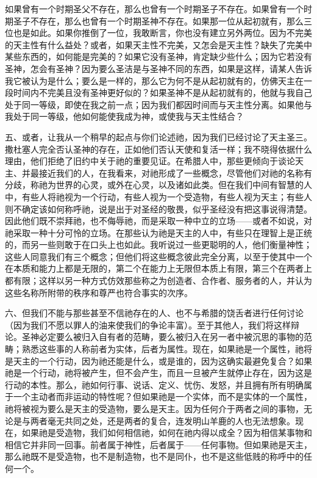 如果曾有一个时期圣父不存在，那么也曾有一个时期圣子不存在。如果曾有一个时期圣子不存在，那么也曾有一个时期圣神不存在。如果那一位从起初就有，那么三位也是如此。如果你推倒了一位，我敢断言，你也没有建立另外两位。因为不完美的天主性有什么益处？或者，如果天主性不完美，又怎会是天主性？缺失了完美中某些东西的，如何能是完美的？如果它没有圣神，肯定缺少些什么；因为它若没有圣神，怎会有圣神？因为要么圣洁是与圣神不同的东西，如果是这样，请某人告诉我它被认为是什么；要么是一样的，那么它为何不是从起初就有的，仿佛天主在一段时间内不完美且没有圣神更好似的？如果圣神不是从起初就有的，他就与我自己处于同一等级，即使在我之前一点；因为我们都因时间而与天主性分离。如果他与我处于同一等级，他如何能使我成为神，或使我与天主性结合？\par

五、或者，让我从一个稍早的起点与你们论述祂，因为我们已经讨论了天主圣三。撒杜塞人完全否认圣神的存在，正如他们否认天使和复活一样；我不晓得依据什么理由，他们拒绝了旧约中关于祂的重要见证。在希腊人中，那些更倾向于谈论天主、并最接近我们的人，在我看来，对祂形成了一些概念，尽管他们对祂的名称有分歧，称祂为世界的心灵，或外在心灵，以及诸如此类。但在我们中间有智慧的人中，有些人将祂视为一个行动，有些人视为一个受造物，有些人视为天主；有些人则不确定该如何称呼祂，说是出于对圣经的敬畏，似乎圣经没有把这事说得清楚。因此他们既不崇拜祂，也不侮辱祂，而是采取一种中立的立场——或者不如说，对祂采取一种十分可怜的立场。在那些认为祂是天主的人中，有些只在理智上是正统的，而另一些则敢于在口头上也如此。我听说过一些更聪明的人，他们衡量神性；这些人同意我们有三个概念；但他们将这些概念彼此完全分离，以至于使其中一个在本质和能力上都是无限的，第二个在能力上无限但本质上有限，第三个在两者上都有限；这样以另一种方式仿效那些称之为创造者、合作者、服务者的人，并认为这些名称所附带的秩序和尊严也符合事实的次序。\par

六、但我们不能与那些甚至不信祂存在的人、也不与希腊的饶舌者进行任何讨论（因为我们不愿以罪人的油来使我们的争论丰富）。至于其他人，我们将这样辩论。圣神必定要么被归入自有者的范畴，要么被归入在另一者中被沉思的事物的范畴；熟悉这些事的人称前者为实体，后者为属性。现在，如果祂是一个属性，祂将是天主的一个行动，因为祂还能是什么，或是谁的，因为这确实最避免复合？如果祂是一个行动，祂将被产生，但不会产生，而且一旦被产生就停止存在，因为这是行动的本性。那么，祂如何行事、说话、定义、忧伤、发怒，并且拥有所有明确属于一个主动者而非运动的特性呢？但如果祂是一个实体，而不是实体的一个属性，祂将被视为要么是天主的受造物，要么是天主。因为任何介于两者之间的事物，无论是与两者毫无共同之处，还是两者的复合，连发明山羊鹿的人也无法想象。现在，如果祂是受造物，我们如何相信祂，如何在祂内得以成全？因为相信某事物和相信它并非同一回事。前者属于神性，后者属于——任何事物。但如果祂是天主，那么祂既不是受造物，也不是制造物，也不是同仆，也不是这些低贱的称呼中的任何一个。\par

